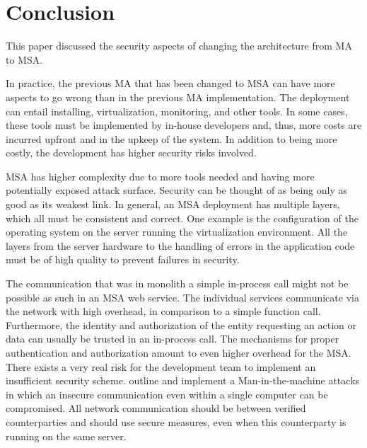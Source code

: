 \section{Conclusion}
\begin{sloppypar}
    This paper discussed the security aspects of changing the architecture from
    MA to MSA.
\end{sloppypar}
\begin{sloppypar}
    In practice, the previous MA that has been changed to MSA can have more
    aspects to go wrong than in the previous MA implementation. The deployment
    can entail installing, virtualization, monitoring, and other tools. In some
    cases, these tools must be implemented by in-house developers and, thus,
    more costs are incurred upfront and in the upkeep of the system. In addition
    to being more costly, the development has higher security risks involved.
\end{sloppypar}
\begin{sloppypar}
    MSA has higher complexity due to more tools needed and having more
    potentially exposed attack surface. Security can be thought of as being only
    as good as its weakest link. In general, an MSA deployment has multiple
    layers, which all must be consistent and correct. One example is the
    configuration of the operating system on the server running the
    virtualization environment. All the layers from the server hardware to the
    handling of errors in the application code must be of high quality to
    prevent failures in security.
\end{sloppypar}
\begin{sloppypar}
    The communication that was in monolith a simple in-process call might not be
    possible as such in an MSA web service. The individual services communicate
    via the network with high overhead, in comparison to a simple function call.
    Furthermore, the identity and authorization of the entity requesting an
    action or data can usually be trusted in an in-process call. The mechanisms
    for proper authentication and authorization amount to even higher overhead
    for the MSA. There exists a very real risk for the development team to
    implement an insufficient security scheme. \citet{maninthemachine} outline
    and implement a Man-in-the-machine attacks in which an insecure
    communication even within a single computer can be compromised. All network
    communication should be between verified counterparties and should use
    secure measures, even when this counterparty is running on the same
    server.
\end{sloppypar}
